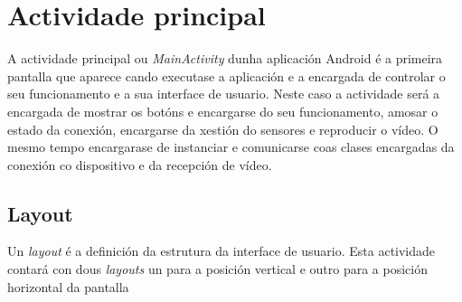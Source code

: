 \section{Actividade principal}
A actividade principal ou \emph{MainActivity} dunha aplicación Android é a primeira pantalla que aparece cando executase a aplicación e a encargada de controlar o seu funcionamento e a sua interface de usuario. Neste caso a actividade será a encargada de mostrar os botóns e encargarse do seu funcionamento, amosar o estado da conexión, encargarse da xestión do sensores e reproducir o vídeo. O mesmo tempo encargarase de instanciar e comunicarse coas clases encargadas da conexión co dispositivo e da recepción de vídeo.

\subsection{Layout}
Un \emph{layout} é a definición da estrutura da interface de usuario. Esta actividade contará con dous \emph{layouts} un para a posición vertical e outro para a posición horizontal da pantalla
